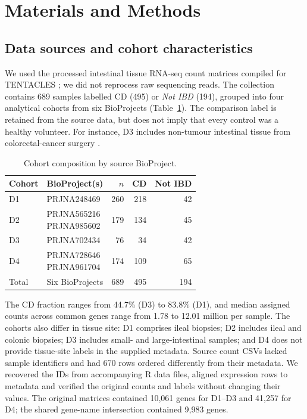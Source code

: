 \section{Materials and Methods}
\subsection{Data sources and cohort characteristics}
\label{sec:dataset}
We used the processed intestinal tissue RNA-seq count matrices compiled for TENTACLES \cite{montesi2026tentacles}; we did not reprocess raw sequencing reads. The collection contains 689 samples labelled CD (495) or \emph{Not IBD} (194), grouped into four analytical cohorts from six BioProjects (Table~\ref{tab:cohorts}). The comparison label is retained from the source data, but does not imply that every control was a healthy volunteer. For instance, D3 includes non-tumour intestinal tissue from colorectal-cancer surgery \cite{friedrich2021il1}.

\begin{table}[!t]
\caption{Cohort composition by source BioProject.}
\label{tab:cohorts}
\centering\footnotesize
\setlength{\tabcolsep}{3.5pt}
\renewcommand{\arraystretch}{1.1}
\begin{tabular}{@{}llrrr@{}}
\toprule
Cohort & BioProject(s) & $n$ & CD & Not IBD\\
\midrule
D1 & PRJNA248469 & 260 & 218 & 42\\
D2 & \shortstack[l]{PRJNA565216\\PRJNA985602} & 179 & 134 & 45\\
D3 & PRJNA702434 & 76 & 34 & 42\\
D4 & \shortstack[l]{PRJNA728646\\PRJNA961704} & 174 & 109 & 65\\
\midrule
Total & Six BioProjects & 689 & 495 & 194\\
\bottomrule
\end{tabular}
\end{table}

The CD fraction ranges from 44.7\% (D3) to 83.8\% (D1), and median assigned counts across common genes range from 1.78 to 12.01 million per sample. The cohorts also differ in tissue site: D1 comprises ileal biopsies; D2 includes ileal and colonic biopsies; D3 includes small- and large-intestinal samples; and D4 does not provide tissue-site labels in the supplied metadata. Source count CSVs lacked sample identifiers and had 670 rows ordered differently from their metadata. We recovered the IDs from accompanying R data files, aligned expression rows to metadata and verified the original counts and labels without changing their values. The original matrices contained 10,061 genes for D1--D3 and 41,257 for D4; the shared gene-name intersection contained 9,983 genes.

